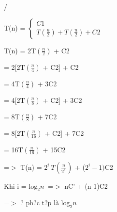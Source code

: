 \documentclass{article} %
\begin{document}


/ 

\noindent T(n) = $\left\{ \begin{array}{c}
C1 \\ 
T\left(\frac{n}{2}\right)+T\left(\frac{n}{2}\right)+C2 \end{array}
\right.$

\noindent 

\noindent T(n) = 2T$\left(\frac{n}{2}\right)$ + C2

 = 2[2T$\left(\frac{n}{4}\right)$ + C2] + C2

 = 4T$\left(\frac{n}{4}\right)$ + 3C2

 = 4[2T$\left(\frac{n}{8}\right)$ + C2] + 3C2

 = 8T$\left(\frac{n}{8}\right)$ + 7C2

 = 8[2T$\left(\frac{n}{16}\right)$ + C2] + 7C2

 = 16T$\left(\frac{n}{16}\right)$ + 15C2

\noindent =$\mathrm{>}$ T(n) = $2^i\ T\left(\frac{n}{2^i\ }\right)$ + ($2^i-1)$C2

\noindent Khi i = ${{\mathrm{log}}_2 n\ }$ =$\mathrm{>}$ nC' + (n-1)C2

\noindent =$\mathrm{>}$ {\dj}? ph?c t?p l\`{a} ${{\mathrm{log}}_2 n\ }$

\noindent 
\end{document}
